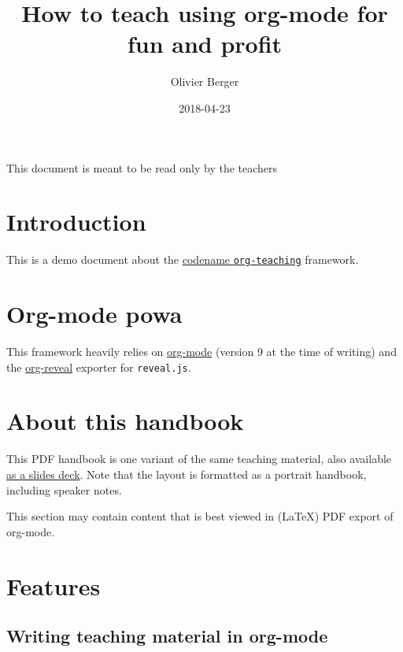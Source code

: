 \documentclass[a4paper]{article}
\author{Olivier Berger}
\date{2018-04-23}
\title{How to teach using org-mode for fun and profit}
\begin{document}
\maketitle
\setcounter{tocdepth}{2}
\tableofcontents

\begin{ABSTRACT}
\begin{shaded}
This document is meant to be read only by the teachers
\end{shaded}
\end{ABSTRACT}



\section{Introduction}
\label{sec:org96c84ae}

This is a demo document about the
\href{http://www-public.tem-tsp.eu/\~berger\_o/org-teaching/}{codename \texttt{org-teaching}} framework.

\section{Org-mode powa}
\label{sec:org14dde1c}

This framework heavily relies on \href{http://orgmode.org/}{org-mode} (version 9 at the time of writing) and the \href{https://github.com/yjwen/org-reveal/}{org-reveal} exporter for \texttt{reveal.js}.

\section{About this handbook}
\label{sec:org6885833}

This PDF handbook is one variant of the same teaching material, also
available \href{./slides.html}{as a slides deck}. Note that the layout is
formatted as a portrait handbook, including speaker notes.

This section may contain content that is best viewed in (\LaTeX{}) PDF export of org-mode.

\section{Features}
\label{sec:orgdd49ccc}
\subsection{Writing teaching material in org-mode}
\label{sec:org3576d7c}
\end{document}
